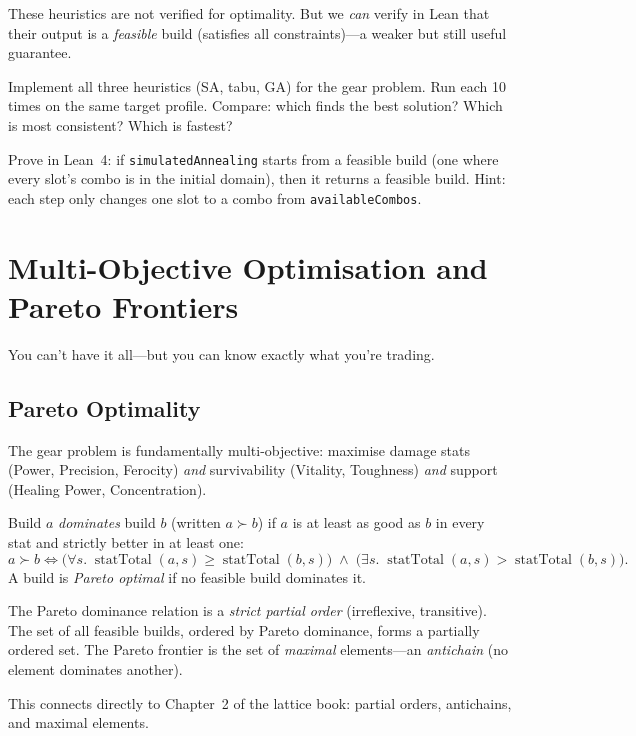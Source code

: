 \documentclass[11pt, a4paper, oneside]{book}
\newcommand{\statTotal}{\operatorname{statTotal}}
\begin{document}
These heuristics are not verified for optimality.  But we \emph{can} verify
in Lean that their output is a \emph{feasible} build (satisfies all
constraints)---a weaker but still useful guarantee.

\begin{exercisebox}
Implement all three heuristics (SA, tabu, GA) for the gear problem.
Run each 10 times on the same target profile.  Compare: which finds
the best solution?  Which is most consistent?  Which is fastest?
\end{exercisebox}

\begin{exercisebox}
Prove in Lean~4: if \texttt{simulatedAnnealing} starts from a feasible build
(one where every slot's combo is in the initial domain), then it returns
a feasible build.  Hint: each step only changes one slot to a combo from
\texttt{availableCombos}.
\end{exercisebox}

\chapter{Multi-Objective Optimisation and Pareto Frontiers}
\label{ch:pareto}

\epigraph{You can't have it all---but you can know exactly what you're trading.}{}

\section{Pareto Optimality}

The gear problem is fundamentally multi-objective: maximise damage stats
(Power, Precision, Ferocity) \emph{and} survivability (Vitality, Toughness)
\emph{and} support (Healing Power, Concentration).

\begin{defbox}[title={Pareto Dominance}]
Build $a$ \emph{dominates} build $b$ (written $a \succ b$) if $a$ is at
least as good as $b$ in every stat and strictly better in at least one:
\[
  a \succ b \iff
  \big(\forall s.\; \statTotal(a, s) \geq \statTotal(b, s)\big)
  \;\wedge\;
  \big(\exists s.\; \statTotal(a, s) > \statTotal(b, s)\big).
\]
A build is \emph{Pareto optimal} if no feasible build dominates it.
\end{defbox}

\begin{crossrefbox}
The Pareto dominance relation is a \emph{strict partial order} (irreflexive,
transitive).  The set of all feasible builds, ordered by Pareto dominance,
forms a partially ordered set.  The Pareto frontier is the set of
\emph{maximal} elements---an \emph{antichain} (no element dominates another).

This connects directly to Chapter~2 of the lattice book: partial orders,
antichains, and maximal elements.
\end{crossrefbox}
\end{document}
